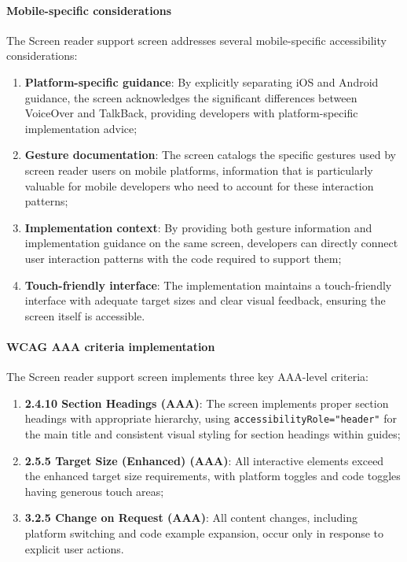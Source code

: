 \paragraph{Mobile-specific considerations}

The Screen reader support screen addresses several mobile-specific accessibility considerations:

\begin{enumerate}
    \item \textbf{Platform-specific guidance}: By explicitly separating iOS and Android guidance, the screen acknowledges the significant differences between VoiceOver and TalkBack, providing developers with platform-specific implementation advice;
    
    \item \textbf{Gesture documentation}: The screen catalogs the specific gestures used by screen reader users on mobile platforms, information that is particularly valuable for mobile developers who need to account for these interaction patterns;
    
    \item \textbf{Implementation context}: By providing both gesture information and implementation guidance on the same screen, developers can directly connect user interaction patterns with the code required to support them;
    
    \item \textbf{Touch-friendly interface}: The implementation maintains a touch-friendly interface with adequate target sizes and clear visual feedback, ensuring the screen itself is accessible.
\end{enumerate}

\paragraph{WCAG AAA criteria implementation}

The Screen reader support screen implements three key AAA-level criteria:

\begin{enumerate}
    \item \textbf{2.4.10 Section Headings (AAA)}: The screen implements proper section headings with appropriate hierarchy, using \texttt{accessibilityRole="header"} for the main title and consistent visual styling for section headings within guides;
    
    \item \textbf{2.5.5 Target Size (Enhanced) (AAA)}: All interactive elements exceed the enhanced target size requirements, with platform toggles and code toggles having generous touch areas;
    
    \item \textbf{3.2.5 Change on Request (AAA)}: All content changes, including platform switching and code example expansion, occur only in response to explicit user actions.
\end{enumerate}


